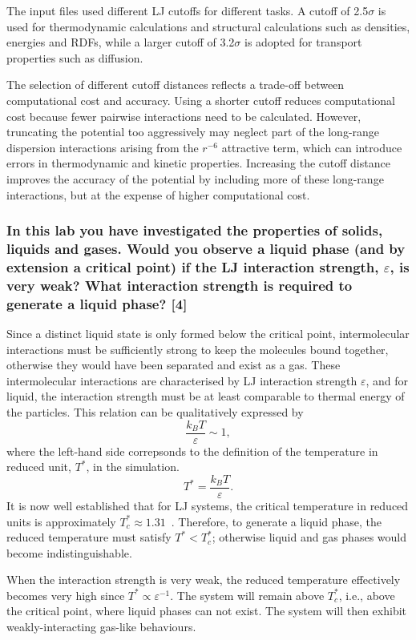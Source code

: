 \documentclass[a4paper,10pt,twocolumn]{article}
\begin{document}
The input files used different LJ cutoffs for different tasks. A cutoff of 2.5$\sigma$ is used for thermodynamic calculations and structural calculations such as densities, energies and RDFs, while a larger cutoff of 3.2$\sigma$ is adopted for transport properties such as diffusion.

The selection of different cutoff distances reflects a trade-off between computational cost and accuracy. Using a shorter cutoff reduces computational cost because fewer pairwise interactions need to be calculated. However, truncating the potential too aggressively may neglect part of the long-range dispersion interactions arising from the $r^{-6}$ attractive term, which can introduce errors in thermodynamic and kinetic properties. Increasing the cutoff distance improves the accuracy of the potential by including more of these long-range interactions, but at the expense of higher computational cost.


\subsubsection*{In this lab you have investigated the properties of solids, liquids and gases. Would you observe a liquid phase (and by extension a critical point) if the LJ interaction strength, $\varepsilon$, is very weak? What interaction strength is required to generate a liquid phase? [4]}

Since a distinct liquid state is only formed below the critical point, intermolecular interactions must be sufficiently strong to keep the molecules bound together, otherwise they would have been separated and exist as a gas. These intermolecular interactions are characterised by LJ interaction strength $\varepsilon$, and for liquid, the interaction strength must be at least comparable to thermal energy of the particles. This relation can be qualitatively expressed by
\[
\frac{k_BT}{\varepsilon}\sim1,
\]
where the left-hand side correpsonds to the definition of the temperature in reduced unit, $T^*$, in the simulation.
\[
T^*=\frac{k_B T}{\varepsilon}.
\]
It is now well established that for LJ systems, the critical temperature in reduced units is approximately $T^*_c\approx1.31$~\cite{perez2006critical}. Therefore, to generate a liquid phase, the reduced temperature must satisfy $T^*<T^*_c$; otherwise liquid and gas phases would become indistinguishable.

When the interaction strength is very weak, the reduced temperature effectively becomes very high since $T^*\propto\varepsilon^{-1}$. The system will remain above $T^*_c$, i.e., above the critical point, where liquid phases can not exist. The system will then exhibit weakly-interacting gas-like behaviours.
\end{document}
